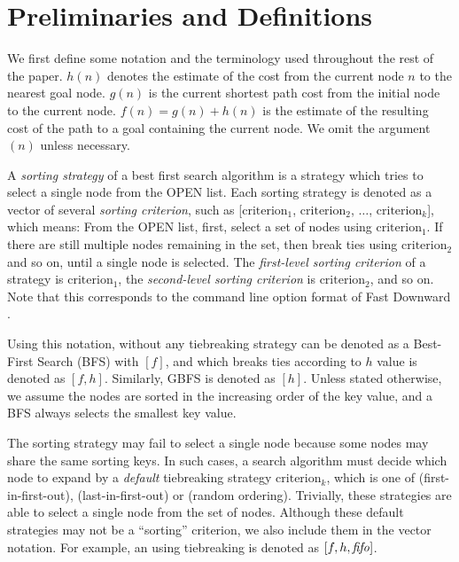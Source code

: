 \section{Preliminaries and Definitions}

\label{sec:preliminaries}

We first define some notation and the terminology used throughout the
rest of the paper.
$h(n)$ denotes the estimate of the cost from the current node $n$ to the nearest goal node.
$g(n)$ is the current shortest path cost from the initial node to the
current node.
$f(n)=g(n)+h(n)$ is the estimate of the resulting cost of the path to a goal
containing the current node.
We omit the argument $(n)$ unless necessary.

A \emph{sorting strategy} of a best first search algorithm is a strategy
which tries to select a single node from the OPEN list.
Each sorting strategy is denoted as a vector of several \emph{sorting criterion}, such as
[$\text{criterion}_1$, $\text{criterion}_2$, $\ldots$,
$\text{criterion}_k$], which means: From the OPEN list, first, select a
set of nodes using $\text{criterion}_1$.  If there are still multiple
nodes remaining in the set, then break ties using $\text{criterion}_2$
and so on, until a single node is selected.  The \emph{first-level
sorting criterion} of a strategy is $\text{criterion}_1$, the
\emph{second-level sorting criterion} is $\text{criterion}_2$, and so on.
Note that this corresponds to the command line option format of Fast
Downward \cite{Helmert2006}.

Using this notation, \astar without any tiebreaking strategy can be
denoted as a Best-First Search (BFS) with $[f]$, and \astar which breaks ties according to $h$
value is denoted as $[f,h]$. Similarly, GBFS is denoted as 
$[h]$.  Unless stated otherwise, we assume the nodes are sorted in the
increasing order of the key value, and a BFS always selects the smallest
key value.

The sorting strategy may fail to select a single node because some nodes
may share the same sorting keys. In such cases, a search algorithm must
decide which node to expand by a \emph{default} tiebreaking
strategy $\text{criterion}_k$, which is one of \fifo (first-in-first-out), \lifo
(last-in-first-out) or \ro (random ordering).  Trivially, these
strategies are able to select a single node from the set of
nodes. Although these default strategies may not be a ``sorting''
criterion, we also include them in the vector notation. For
example, an \astar using \fifo tiebreaking is denoted as $[f,h,{\text{\textit{fifo}}}]$.


